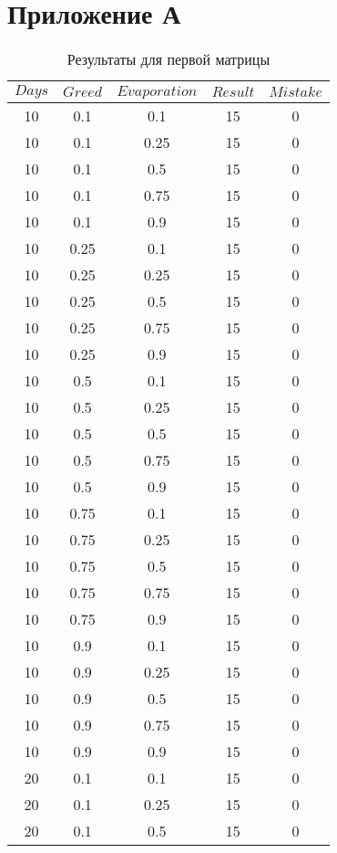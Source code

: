 \documentclass{bmstu}
\begin{document}
\chapter{Приложение А}
\begin{center}
	\captionsetup{justification=raggedright,singlelinecheck=off}
	\begin{longtable}[c]{|c|c|c|c|c|}
		\caption{Результаты для первой матрицы\label{tbl:table_a}}\\ \hline
		$Days$ & $Greed$ & $Evaporation$ & $Result$ & $Mistake$ \\ \hline
		10 & 0.1 & 0.1 & 15 & 0 \\\hline
10 & 0.1 & 0.25 & 15 & 0 \\\hline
10 & 0.1 & 0.5 & 15 & 0 \\\hline
10 & 0.1 & 0.75 & 15 & 0 \\\hline
10 & 0.1 & 0.9 & 15 & 0 \\\hline
10 & 0.25 & 0.1 & 15 & 0 \\\hline
10 & 0.25 & 0.25 & 15 & 0 \\\hline
10 & 0.25 & 0.5 & 15 & 0 \\\hline
10 & 0.25 & 0.75 & 15 & 0 \\\hline
10 & 0.25 & 0.9 & 15 & 0 \\\hline
10 & 0.5 & 0.1 & 15 & 0 \\\hline
10 & 0.5 & 0.25 & 15 & 0 \\\hline
10 & 0.5 & 0.5 & 15 & 0 \\\hline
10 & 0.5 & 0.75 & 15 & 0 \\\hline
10 & 0.5 & 0.9 & 15 & 0 \\\hline
10 & 0.75 & 0.1 & 15 & 0 \\\hline
10 & 0.75 & 0.25 & 15 & 0 \\\hline
10 & 0.75 & 0.5 & 15 & 0 \\\hline
10 & 0.75 & 0.75 & 15 & 0 \\\hline
10 & 0.75 & 0.9 & 15 & 0 \\\hline
10 & 0.9 & 0.1 & 15 & 0 \\\hline
10 & 0.9 & 0.25 & 15 & 0 \\\hline
10 & 0.9 & 0.5 & 15 & 0 \\\hline
10 & 0.9 & 0.75 & 15 & 0 \\\hline
10 & 0.9 & 0.9 & 15 & 0 \\\hline
20 & 0.1 & 0.1 & 15 & 0 \\\hline
20 & 0.1 & 0.25 & 15 & 0 \\\hline
20 & 0.1 & 0.5 & 15 & 0 \\\hline

\end{longtable}
\end{center}
\end{document}
